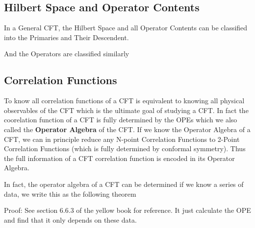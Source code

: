 \subsection{Hilbert Space and Operator Contents}

In a General CFT, the Hilbert Space and all Operator Contents can be
classified into the Primaries and Their Descendent.

And the Operators are classified similarly

\subsection{Correlation Functions}\label{sec:CFT Correlation Functions}

To know all correlation functions of a CFT is equivalent to knowing
all physical observables of the CFT which is the ultimate goal of
studying a CFT. In fact the coorelation function of a CFT is fully
determined by the OPEs which we also called the \textbf{Operator
Algebra} of the CFT.
If we know the Operator Algebra of a CFT, we can in principle reduce
any N-point Correlation Functions to 2-Point Correlation Functions
(which is fully determined by conformal symmetry). Thus the full
information of a CFT correlation function is encoded in its Operator Algebra.

In fact, the operator algebra of a CFT can be determined if we know a
series of data, we write this as the following theorem

Proof: See section 6.6.3 of the yellow book for reference. It just
calculate the OPE and find that it only depends on these data.

